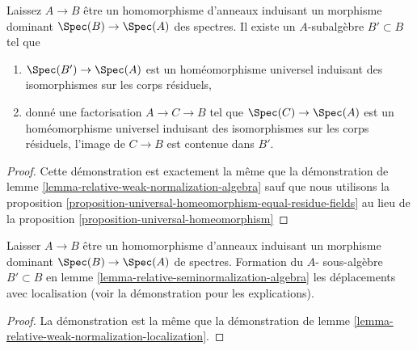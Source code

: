 \begin{lemma}

\label{lemma-relative-seminormalization-algebra}
Laissez $A \to B$ être un homomorphisme d'anneaux induisant un morphisme dominant $\Spec(B) \to \Spec(A)$ des spectres. Il existe un $A$-subalgèbre $B' \subset B$ tel que
\begin{enumerate}
\item $\Spec(B') \to \Spec(A)$ est un homéomorphisme universel induisant des isomorphismes sur les corps résiduels,
\item donné une factorisation $A \to C \to B$ tel que $\Spec(C) \to \Spec(A)$ est un homéomorphisme universel induisant des isomorphismes sur les corps résiduels, l'image de $C \to B$ est contenue dans $B'$.
\end{enumerate}

\end{lemma}

\begin{proof}
Cette démonstration est exactement la même que la démonstration de lemme \ref{lemma-relative-weak-normalization-algebra} sauf que nous utilisons la proposition \ref{proposition-universal-homeomorphism-equal-residue-fields} au lieu de la proposition \ref{proposition-universal-homeomorphism}
\end{proof}

\begin{lemma}

\label{lemma-relative-seminormalization-localization}

Laisser $A \to B$ être un homomorphisme d'anneaux induisant un morphisme dominant
$\Spec(B) \to \Spec(A)$ de spectres. Formation du $A$- sous-algèbre
$B' \subset B$ en lemme \ref{lemma-relative-seminormalization-algebra}
les déplacements avec localisation (voir la démonstration pour les explications).

\end{lemma}

\begin{proof}
La démonstration est la même que la démonstration de lemme \ref{lemma-relative-weak-normalization-localization}.
\end{proof}

